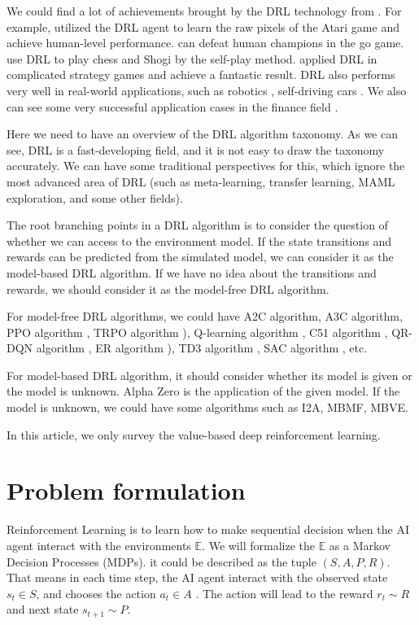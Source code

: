 \documentclass{article}
\begin{document}
We could find a lot of achievements brought by the DRL technology  from \citep{lecun2015deep, schmidhuber2015deep, goodfellow2016deep}. For example, \citep{mnih2015human} utilized the DRL agent to learn the raw pixels of the Atari game and achieve human-level performance. \citep{silver2016mastering} can defeat human champions in the go game. \citep{silver2018general} use DRL to play chess and Shogi by the self-play method. \citep{vinyals2019alphastar} applied DRL in complicated strategy games and achieve a fantastic result. DRL also performs very well in real-world applications, such as robotics \citep{gandhi2017learning, pinto2017asymmetric}, self-driving cars \citep{pan2017virtual}. We also can see some very successful application cases in the finance field \citep{deng2016deep}. 

Here we need to have an overview of the DRL algorithm taxonomy. As we can see, DRL is a fast-developing field, and it is not easy to draw the taxonomy accurately. We can have some traditional perspectives for this, which ignore the most advanced area of DRL (such as meta-learning, transfer learning, MAML exploration, and some other fields).

The root branching points in a DRL algorithm is to consider the question of whether we can access to the environment model. If the state transitions and rewards can be predicted from the simulated model, we can consider it as the model-based DRL algorithm. If we have no idea about the transitions and rewards, we should consider it as the model-free DRL algorithm.

For model-free DRL algorithms, we could have A2C algorithm, A3C algorithm\citep{mnih2016asynchronous}, PPO algorithm \citep{schulman2017proximal}, TRPO algorithm \citep{schulman2015trust}), Q-learning algorithm \citep{mnih2013playing}, C51 algorithm \citep{bellemare2017distributional}, QR-DQN algorithm \citep{dabney2018distributional}, ER algorithm \citep{andrychowicz2017hindsight}), TD3 algorithm \citep{fujimoto2018addressing}, SAC algorithm \citep{haarnoja2018soft}, etc.

For model-based DRL algorithm, it should consider whether its model is given or the model is unknown. Alpha Zero \citep{silver2018general} is the application of the given model. If the model is unknown, we could have some algorithms such as I2A, MBMF, MBVE. 

In this article, we only survey the value-based deep reinforcement learning. 
%
\section{Problem formulation}
\label{sec:Problem formulation}
Reinforcement Learning \citep{sutton2018reinforcement} is to learn how to make sequential decision when the AI agent interact with the environments $\mathbb{E}$. We will formalize the $\mathbb{E}$ as a Markov Decision Processes (MDPs). it could be described as the tuple $({S},{A},{P},{R})$.  That means in each time step, the AI agent interact with the observed state $s_t \in {S}$, and chooses the action $a_t \in {A}$ . The action will lead to the reward $r_t \sim {R}$ and next state $s_{t+1} \sim {P}$.
\end{document}
